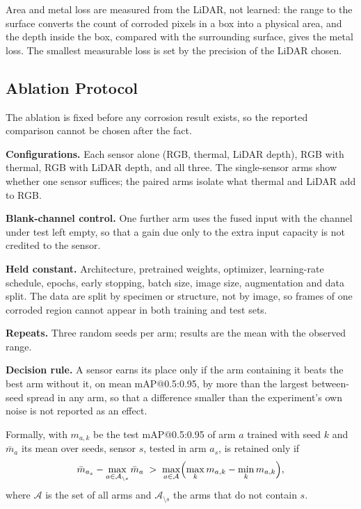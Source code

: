 Area and metal loss are measured from the LiDAR, not learned: the range to the
surface converts the count of corroded pixels in a box into a physical area, and
the depth inside the box, compared with the surrounding surface, gives the metal
loss. The smallest measurable loss is set by the precision of the LiDAR chosen.

\subsection{Ablation Protocol}
\label{sec:ablation}

The ablation is fixed before any corrosion result exists, so the reported
comparison cannot be chosen after the fact.

\textbf{Configurations.} Each sensor alone (RGB, thermal, LiDAR depth), RGB with
thermal, RGB with LiDAR depth, and all three. The single-sensor arms show whether
one sensor suffices; the paired arms isolate what thermal and LiDAR add to RGB.

\textbf{Blank-channel control.} One further arm uses the fused input with the
channel under test left empty, so that a gain due only to the extra input
capacity is not credited to the sensor.

\textbf{Held constant.} Architecture, pretrained weights, optimizer, learning-rate
schedule, epochs, early stopping, batch size, image size, augmentation and data
split. The data are split by specimen or structure, not by image, so frames of
one corroded region cannot appear in both training and test sets.

\textbf{Repeats.} Three random seeds per arm; results are the mean with the
observed range.

\textbf{Decision rule.} A sensor earns its place only if the arm containing it
beats the best arm without it, on mean mAP@0.5:0.95, by more than the largest
between-seed spread in any arm, so that a difference smaller than the
experiment's own noise is not reported as an effect.

Formally, with $m_{a,k}$ be the test mAP@0.5:0.95 of arm $a$ trained with seed
$k$ and $\bar{m}_a$ its mean over seeds, sensor $s$, tested in arm $a_s$, is
retained only if
\begin{equation}
\bar{m}_{a_s} - \max_{a \in \mathcal{A}_{\setminus s}} \bar{m}_a \;>\;
\max_{a \in \mathcal{A}} \Bigl( \max_k m_{a,k} - \min_k m_{a,k} \Bigr),
\label{eq:decision}
\end{equation}
where $\mathcal{A}$ is the set of all arms and $\mathcal{A}_{\setminus s}$ the
arms that do not contain $s$.

